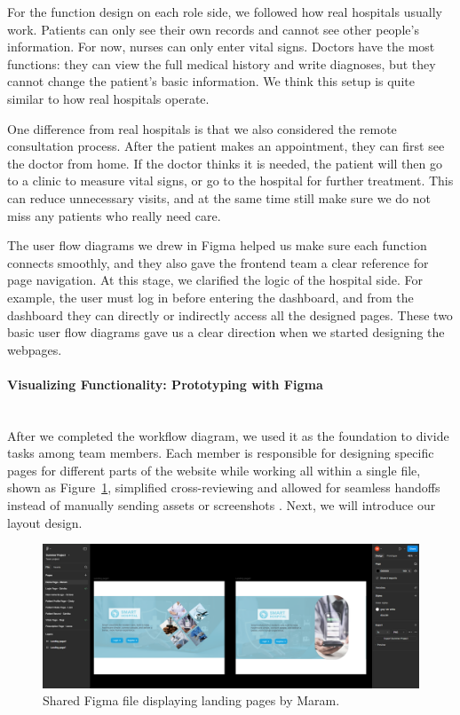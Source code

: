 For the function design on each role side, we followed how real hospitals usually work.
Patients can only see their own records and cannot see other people’s information.
For now, nurses can only enter vital signs.
Doctors have the most functions: they can view the full medical history and write diagnoses,
but they cannot change the patient’s basic information.
We think this setup is quite similar to how real hospitals operate.

One difference from real hospitals is that we also considered the remote consultation process.
After the patient makes an appointment, they can first see the doctor from home.
If the doctor thinks it is needed, the patient will then go to a clinic to measure vital signs,
or go to the hospital for further treatment.
This can reduce unnecessary visits, and at the same time still make sure we do not miss any patients who really need care.

The user flow diagrams we drew in Figma helped us make sure each function connects smoothly,
and they also gave the frontend team a clear reference for page navigation.
At this stage, we clarified the logic of the hospital side.
For example, the user must log in before entering the dashboard,
and from the dashboard they can directly or indirectly access all the designed pages.
These two basic user flow diagrams gave us a clear direction when we started designing the webpages.

\paragraph{Visualizing Functionality: Prototyping with Figma}\mbox{}\\
After we completed the workflow diagram, we used it as the foundation to divide tasks among team members. Each member is responsible for designing specific pages for different parts of the website while working all within a single file, shown as Figure~\ref{fig:3-2-2-DS-figma-f1}, simplified cross-reviewing and allowed for seamless handoffs instead of manually sending assets or screenshots . Next, we will introduce our layout design.
\begin{figure}[H]
  \centering
  \includegraphics[width=0.8\linewidth]{images03/3-2-2-figure1.png}
  \caption{Shared Figma file displaying landing pages by Maram.}
  \label{fig:3-2-2-DS-figma-f1}
\end{figure}

